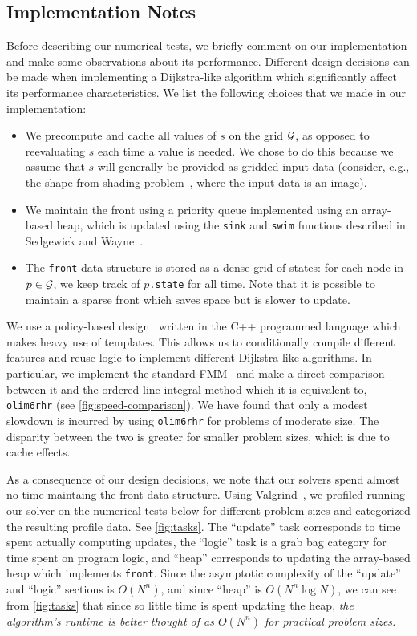 \documentclass[sisc-eikonal.tex]{subfiles}
\begin{document}
\subsection{Implementation Notes}\label{ssec:impl-notes}

Before describing our numerical tests, we briefly comment on our
implementation and make some observations about its
performance. Different design decisions can be made when implementing
a Dijkstra-like algorithm which significantly affect its performance
characteristics. We list the following choices that we made in our
implementation:
\begin{itemize}
\item We precompute and cache all values of $s$ on the grid $\mathcal{G}$,
  as opposed to reevaluating $s$ each time a value is needed. We chose
  to do this because we assume that $s$ will generally be provided as
  gridded input data (consider, e.g., the shape from shading
  problem~\cite{kimmel2001optimal}, where the input data is an image).
\item We maintain the front using a priority queue implemented using
  an array-based heap, which is updated using the \texttt{sink} and
  \texttt{swim} functions described in Sedgewick and
  Wayne~\cite{sedgewick2011algorithms}.
\item The \texttt{front} data structure is stored as a dense grid of
  states: for each node in $p \in \mathcal{G}$, we keep track of
  $p$\texttt{.state} for all time. Note that it is possible to
  maintain a sparse front which saves space but is slower to update.
\end{itemize}

We use a policy-based design~\cite{alexandrescu2001modern} written in
the C++ programmed language which makes heavy use of templates. This
allows us to conditionally compile different features and reuse logic
to implement different Dijkstra-like algorithms. In particular, we
implement the standard FMM~\cite{sethian1996fast} and make a direct
comparison between it and the ordered line integral method which it is
equivalent to, \texttt{olim6rhr} (see \cref{fig:speed-comparison}). We
have found that only a modest slowdown is incurred by using
\texttt{olim6rhr} for problems of moderate size. The disparity between
the two is greater for smaller problem sizes, which is due to cache
effects.

As a consequence of our design decisions, we note that our solvers
spend almost no time maintaing the front data structure. Using
Valgrind~\cite{nethercote2007valgrind}, we profiled running our solver
on the numerical tests below for different problem sizes and
categorized the resulting profile data. See \cref{fig:tasks}. The
``update'' task corresponds to time spent actually computing updates,
the ``logic'' task is a grab bag category for time spent on program
logic, and ``heap'' corresponds to updating the array-based heap which
implements \texttt{front}. Since the asymptotic complexity of the
``update'' and ``logic'' sections is $O(N^n)$, and since ``heap'' is
$O(N^n \log N)$, we can see from \cref{fig:tasks} that since so little
time is spent updating the heap, \emph{the algorithm's runtime is
  better thought of as $O(N^n)$ for practical problem sizes.}
\end{document}

